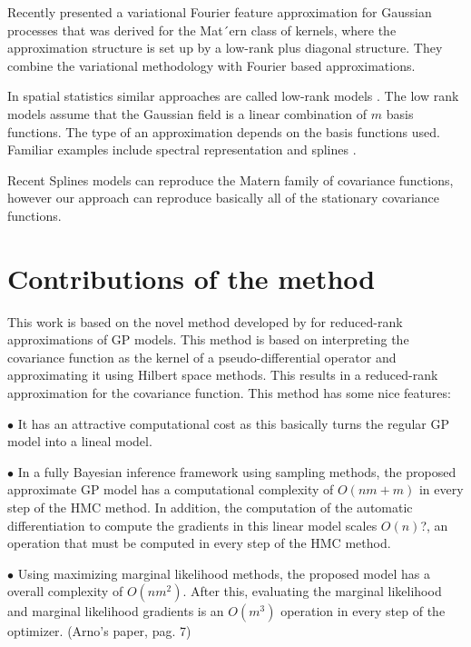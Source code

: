 \documentclass[]{interact}
\theoremstyle{plain}%
\theoremstyle{definition}
\theoremstyle{remark}
\begin{document}
Recently \citep{hensman2017variational} presented a variational Fourier feature approximation for Gaussian processes that was derived for the Mat´ern class of kernels, where the approximation structure is set up by a low-rank plus diagonal structure. They combine the variational methodology with Fourier based approximations.

In spatial statistics similar approaches are called low-rank models \citep{diggle2007springer}. The low rank models assume that the Gaussian field is a linear combination of $m$ basis functions. The type of an approximation depends on the basis functions used. Familiar examples include spectral representation \citep{diggle2007springer,paciorek2007computational,paciorek2007bayesian} and splines \citep{wood2003thin}. 

Recent Splines models can reproduce the Matern family of covariance functions, however our approach can reproduce basically all of the stationary covariance functions.


\section{Contributions of the method}

This work is based on the novel method developed by \cite{solin2018hilbert} for reduced-rank approximations of GP models. This method is based on interpreting the covariance function as the kernel of a pseudo-differential operator and approximating it using Hilbert space methods. This results in a reduced-rank approximation for the covariance function. This method has some nice features:

\vspace{2mm}
$\bullet$ It has an attractive computational cost as this basically turns the regular GP model into a lineal model.

\vspace{2mm}
$\bullet$ In a fully Bayesian inference framework using sampling methods, the proposed approximate GP model has a computational complexity of $O(nm+m)$ in every step of the HMC method. In addition, the computation of the automatic differentiation to compute the gradients in this linear model scales $O(n)$?, an operation that must be computed in every step of the HMC method.

\vspace{2mm}
$\bullet$ Using maximizing marginal likelihood methods, the proposed model has a overall complexity of $O(nm^2)$. After this, evaluating the marginal likelihood and marginal likelihood gradients is an $O(m^3)$ operation in every step of the optimizer. (Arno's paper, pag. 7)
\end{document}
